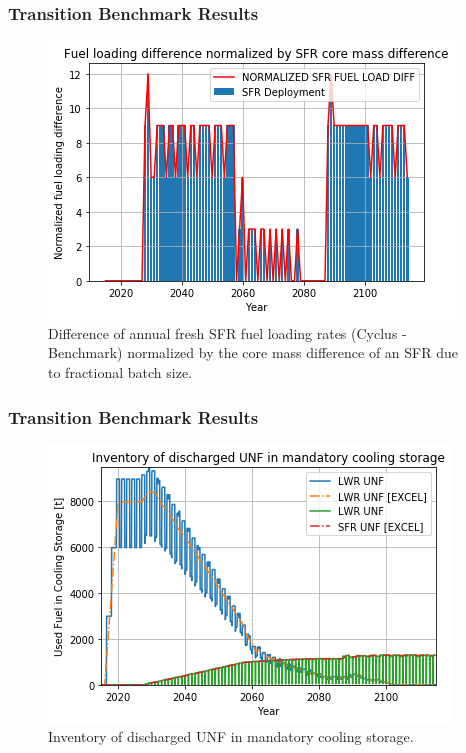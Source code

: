 \begin{frame}
  \frametitle{Transition Benchmark Results}

\begin{figure}[htbp!]
    \begin{center}
        \includegraphics[scale=0.5]{./images/fuel_load_diff_norm.png}
    \end{center}
        \caption{Difference of annual fresh \gls{SFR} fuel loading rates (Cyclus - Benchmark) normalized by the core mass difference of an \gls{SFR} due to fractional batch size.}
    \label{fig:fuel_load_diff_norm}
\end{figure}

\end{frame}
\begin{frame}
  \frametitle{Transition Benchmark Results}
\begin{figure}[htbp!]
    \begin{center}
        \includegraphics[scale=0.5]{./images/fuel_discharge_monthly.png}
    \end{center}
        \caption{Inventory of discharged UNF in mandatory cooling storage.}
    \label{fig:fuel_discharge_monthly}
\end{figure}

\end{frame}
